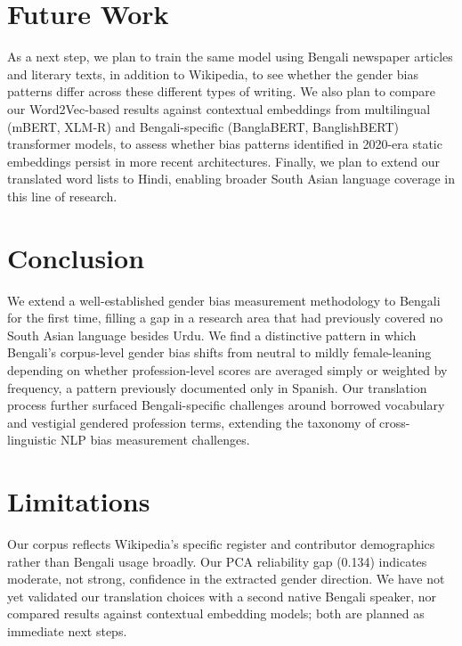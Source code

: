 \documentclass[11pt]{article}
\begin{document}
\section{Future Work}

As a next step, we plan to train the same model using Bengali newspaper articles and literary texts, in addition to Wikipedia, to see whether the gender bias patterns differ across these different types of writing. We also plan to compare our Word2Vec-based results against contextual embeddings from multilingual (mBERT, XLM-R) and Bengali-specific (BanglaBERT, BanglishBERT) transformer models, to assess whether bias patterns identified in 2020-era static embeddings persist in more recent architectures. Finally, we plan to extend our translated word lists to Hindi, enabling broader South Asian language coverage in this line of research.

\section{Conclusion}

We extend a well-established gender bias measurement methodology to Bengali for the first time, filling a gap in a research area that had previously covered no South Asian language besides Urdu. We find a distinctive pattern in which Bengali's corpus-level gender bias shifts from neutral to mildly female-leaning depending on whether profession-level scores are averaged simply or weighted by frequency, a pattern previously documented only in Spanish. Our translation process further surfaced Bengali-specific challenges around borrowed vocabulary and vestigial gendered profession terms, extending the taxonomy of cross-linguistic NLP bias measurement challenges.

\section*{Limitations}

Our corpus reflects Wikipedia's specific register and contributor demographics rather than Bengali usage broadly. Our PCA reliability gap (0.134) indicates moderate, not strong, confidence in the extracted gender direction. We have not yet validated our translation choices with a second native Bengali speaker, nor compared results against contextual embedding models; both are planned as immediate next steps.



\appendix
\end{document}
